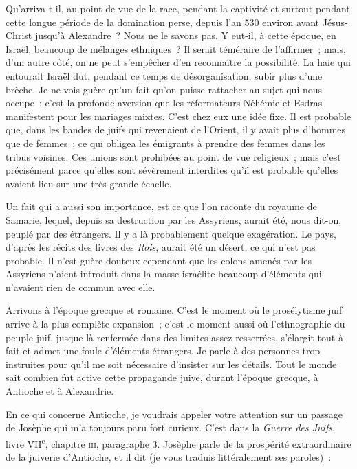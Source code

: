 \documentclass[french,twoside]{book} %
\newcommand\orgName[1]{#1}
\newcommand\persName[1]{#1}
\newcommand\placeName[1]{#1}
\begin{document}
Qu’arriva-t-il, au point de vue de la race, pendant la captivité et surtout pendant cette longue période de la domination perse, depuis l’an 530 environ avant Jésus-Christ jusqu’à {\persName Alexandre} ? Nous ne le savons pas. Y eut-il, à cette époque, en {\placeName Israël}, beaucoup de mélanges ethniques ? Il serait téméraire de l’affirmer ; mais, d’un autre côté, on ne peut s’empêcher d’en reconnaître la possibilité. La haie qui entourait {\placeName Israël} dut, pendant ce temps de désorganisation, subir plus d’une brèche. Je ne vois guère qu’un fait qu’on puisse rattacher au sujet qui nous occupe : c’est la profonde aversion que les réformateurs {\persName Néhémie} et {\persName Esdras} manifestent pour les mariages mixtes. C’est chez eux une idée fixe. Il est probable que, dans les bandes de juifs qui revenaient de l’Orient, il y avait plus d’hommes que de femmes ; ce qui obligea les émigrants à prendre des femmes dans les tribus voisines. Ces unions sont prohibées au point de vue religieux ; mais c’est précisément parce qu’elles sont sévèrement interdites qu’il est probable qu’elles avaient lieu sur une très grande échelle.\par
Un fait qui a aussi son importance, est ce que l’on raconte du {\placeName royaume de Samarie}, lequel, depuis sa destruction par les {\orgName Assyriens}, aurait été, nous dit-on, peuplé par des étrangers. Il y a là probablement quelque exagération. Le pays, d’après les récits des livres des {\itshape Rois}, aurait été un désert, ce qui n’est pas probable. Il n’est guère douteux cependant que les colons amenés par les {\orgName Assyriens} n’aient introduit dans la masse israélite beaucoup d’éléments qui n’avaient rien de commun avec elle.\par
Arrivons à l’époque grecque et romaine. C’est le moment où le prosélytisme juif arrive à la plus complète expansion ; c’est le moment aussi où l’ethnographie du {\orgName peuple juif}, jusque-là renfermée dans des limites assez resserrées, s’élargit tout à fait et admet une foule d’éléments étrangers. Je parle à des personnes trop instruites pour qu’il me soit nécessaire d’insister sur les détails. Tout le monde sait combien fut active cette propagande juive, durant l’époque grecque, à {\placeName Antioche} et à {\placeName Alexandrie}.\par
En ce qui concerne {\placeName Antioche}, je voudrais appeler votre attention sur un passage de {\persName Josèphe} qui m’a toujours paru fort curieux. C’est dans la \emph{Guerre des Juifs}, livre VII\textsuperscript{e}, chapitre \textsc{iii}, paragraphe 3. {\persName Josèphe} parle de la prospérité extraordinaire de la juiverie d’{\placeName Antioche}, et il dit (je vous traduis littéralement ses paroles) :\par
\end{document}
